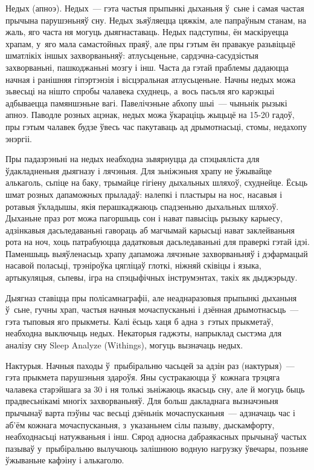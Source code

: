 Недых (апноэ). Недых~--- гэта частыя прыпынкі дыханьня ў~сьне і самая частая прычына парушэньняў сну. Недых зьяўляецца цяжкім, але папраўным станам, на жаль, яго часта ня могуць дыягнаставаць. Недых падступны, ён маскіруецца храпам, у~яго мала самастойных праяў, але пры гэтым ён правакуе разьвіцьцё шматлікіх іншых захворваньняў: атлусьценьне, сардэчна-сасудзістыя захворваньні, пашкоджаньні мозгу і інш. Часта да гэтай праблемы дадаюцца начная і ранішняя гіпэртэнзія і вісцэральная атлусьценьне. Начны недых можа зьвесьці на нішто спробы чалавека схуднець, а~вось пасьля яго карэкцыі адбываецца памяншэньне вагі. Павелічэньне абхопу шыі~--- чыньнік рызыкі апноэ. Паводле розных ацэнак, недых можа ўкараціць жыцьцё на 15-20 гадоў, пры гэтым чалавек будзе ўвесь час пакутаваць ад дрымотнасьці, стомы, недахопу энэргіі.

Пры падазрэньні на недых неабходна зьвярнуцца да спэцыяліста для ўдакладненьня дыягназу і лячэньня. Для зьніжэньня храпу не ўжывайце алькаголь, сьпіце на баку, трымайце гігіену дыхальных шляхоў, схуднейце. Ёсьць шмат розных дапаможных прыладаў: налепкі і пластыры на нос, насавыя і ротавыя ўкладышы, якія перашкаджаюць спадзеньню дыхальных шляхоў. Дыханьне праз рот можа пагоршыць сон і нават павысіць рызыку карыесу, адзінкавыя дасьледаваньні гавораць аб магчымай карысьці нават заклейваньня рота на ноч, хоць патрабуюцца дадатковыя дасьледаваньні для праверкі гэтай ідэі. Паменшыць выяўленасьць храпу дапаможа лячэньне захворваньняў і дэфармацый насавой поласьці, трэніроўка цягліцаў глоткі, ніжняй сківіцы і языка, артыкуляцыя, сьпевы, ігра на спэцыфічных інструмэнтах, такіх як дыджэрыду.

Дыягназ ставіцца пры полісамнаграфіі, але неаднаразовыя прыпынкі дыханьня ў~сьне, гучны храп, частыя начныя мочаспусканьні і дзённая дрымотнасьць~--- гэта тыповыя яго прыкметы. Калі ёсьць хаця б адна з~гэтых прыкметаў, неабходна выключыць недых. Некаторыя гаджэты, напрыклад сыстэма для аналізу сну Sleep Analyze (Withings), могуць вызначаць недых.

Нактурыя. Начныя паходы ў~прыбіральню часьцей за адзін раз (нактурыя)~--- гэта прыкмета парушэньня здароўя. Яны сустракаюцца ў~кожнага трэцяга чалавека старэйшага за 30 і ня толькі зьніжаюць якасьць сну, але й могуць быць прадвесьнікамі многіх захворваньняў. Для больш дакладнага вызначэньня прычынаў варта пэўны час весьці дзёньнік мочаспусканьня~--- адзначаць час і аб'ём кожнага мочаспусканьня, з~указаньнем сілы пазыву, дыскамфорту, неабходнасьці натужваньня і інш. Сярод адносна дабраякасных прычынаў частых пазываў у~прыбіральню вылучаюць залішнюю водную нагрузку ўвечары, позьняе ўжываньне кафэіну і алькаголю.

